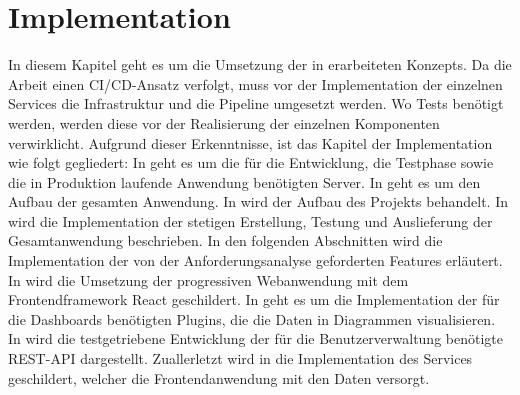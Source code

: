 \chapter{Implementation}
\label{chap:implementation}
In diesem Kapitel geht es um die Umsetzung der in  erarbeiteten
Konzepts. Da die Arbeit einen CI/CD-Ansatz verfolgt, muss vor der Implementation
der einzelnen Services die Infrastruktur und die Pipeline umgesetzt werden. 
Wo Tests benötigt werden, werden diese vor der Realisierung der einzelnen
Komponenten verwirklicht. Aufgrund dieser Erkenntnisse, ist das Kapitel der
Implementation wie folgt gegliedert: In  geht es um
die für die Entwicklung, die Testphase sowie die in Produktion laufende Anwendung
benötigten Server. In  geht es um den Aufbau der gesamten
Anwendung. In  wird der Aufbau des Projekts behandelt.
In  wird die Implementation der stetigen Erstellung, Testung und
Auslieferung der Gesamtanwendung beschrieben. In den folgenden Abschnitten wird die
Implementation der von der Anforderungsanalyse geforderten Features erläutert.
In  wird die Umsetzung der progressiven Webanwendung
mit dem Frontendframework React geschildert. In  geht es um die
Implementation der für die Dashboards benötigten Plugins, die die Daten
in Diagrammen visualisieren. In  wird
die testgetriebene Entwicklung der für die Benutzerverwaltung benötigte REST-API
dargestellt. Zuallerletzt wird in  die Implementation
des Services geschildert, welcher die Frontendanwendung mit den Daten versorgt.


